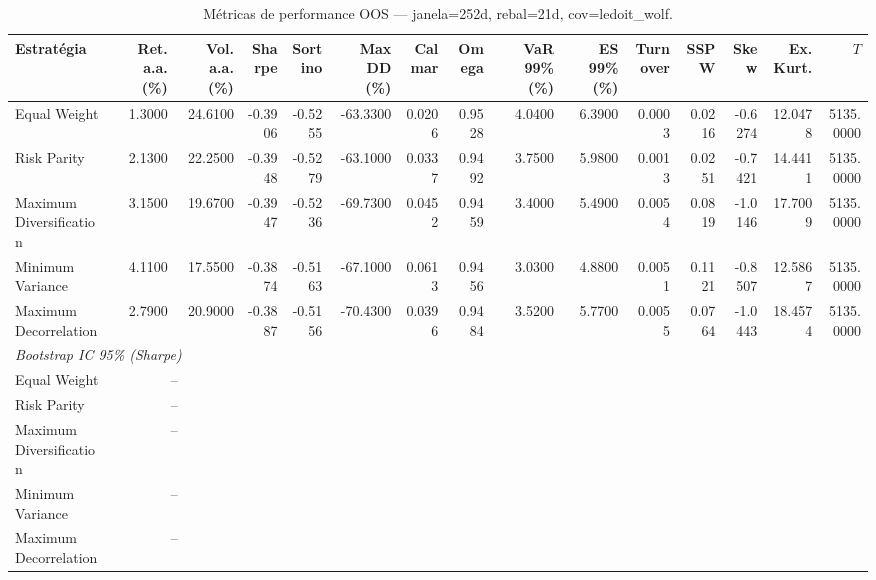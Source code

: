 \begin{table}[htbp]
  \centering
  \caption{Métricas de performance OOS — janela=252d, rebal=21d, cov=ledoit_wolf.}
  \label{tab:comparison_performance}
  \footnotesize
  \begin{tabular}{lrrrrrrrrrrrrrr}
  \toprule
  Estratégia & Ret. a.a. (\%) & Vol. a.a. (\%) & Sharpe & Sortino & Max DD (\%) & Calmar & Omega & VaR 99\% (\%) & ES 99\% (\%) & Turnover & SSPW & Skew & Ex. Kurt. & $T$ \\
  \midrule
  Equal Weight & 1.3000 & 24.6100 & -0.3906 & -0.5255 & -63.3300 & 0.0206 & 0.9528 & 4.0400 & 6.3900 & 0.0003 & 0.0216 & -0.6274 & 12.0478 & 5135.0000 \\
  Risk Parity & 2.1300 & 22.2500 & -0.3948 & -0.5279 & -63.1000 & 0.0337 & 0.9492 & 3.7500 & 5.9800 & 0.0013 & 0.0251 & -0.7421 & 14.4411 & 5135.0000 \\
  Maximum Diversification & 3.1500 & 19.6700 & -0.3947 & -0.5236 & -69.7300 & 0.0452 & 0.9459 & 3.4000 & 5.4900 & 0.0054 & 0.0819 & -1.0146 & 17.7009 & 5135.0000 \\
  Minimum Variance & 4.1100 & 17.5500 & -0.3874 & -0.5163 & -67.1000 & 0.0613 & 0.9456 & 3.0300 & 4.8800 & 0.0051 & 0.1121 & -0.8507 & 12.5867 & 5135.0000 \\
  Maximum Decorrelation & 2.7900 & 20.9000 & -0.3887 & -0.5156 & -70.4300 & 0.0396 & 0.9484 & 3.5200 & 5.7700 & 0.0055 & 0.0764 & -1.0443 & 18.4574 & 5135.0000 \\
  \bottomrule
  \midrule
  \multicolumn{15}{l}{\textit{Bootstrap IC 95\% (Sharpe)}}
  \\
  Equal Weight & \multicolumn{2}{c}{--} \\
  Risk Parity & \multicolumn{2}{c}{--} \\
  Maximum Diversification & \multicolumn{2}{c}{--} \\
  Minimum Variance & \multicolumn{2}{c}{--} \\
  Maximum Decorrelation & \multicolumn{2}{c}{--} \\
  \end{tabular}
\end{table}